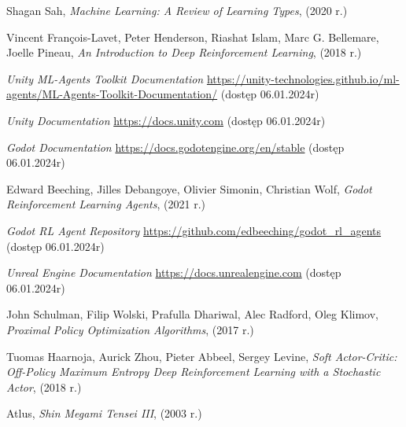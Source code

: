 \documentclass{SGGW-thesis}
\begin{document}
\begin{thebibliography}{9}
  Shagan Sah,
  \textit{Machine Learning: A Review of Learning Types},
  (2020 r.)

  Vincent François-Lavet, Peter Henderson, Riashat Islam, Marc G. Bellemare, Joelle Pineau,
  \textit{An Introduction to Deep Reinforcement Learning},
  (2018 r.)

  \textit{Unity ML-Agents Toolkit Documentation} 
  \url{https://unity-technologies.github.io/ml-agents/ML-Agents-Toolkit-Documentation/}
  (dostęp 06.01.2024r)

  \textit{Unity Documentation}
  \url{https://docs.unity.com}
  (dostęp 06.01.2024r)

  \textit{Godot Documentation}
  \url{https://docs.godotengine.org/en/stable}
  (dostęp 06.01.2024r)

  Edward Beeching, Jilles Debangoye, Olivier Simonin, Christian Wolf,
  \textit{Godot Reinforcement Learning Agents},
  (2021 r.)

  \textit{Godot RL Agent Repository}
  \url{https://github.com/edbeeching/godot_rl_agents}
  (dostęp 06.01.2024r)

  \textit{Unreal Engine Documentation}
  \url{https://docs.unrealengine.com}
  (dostęp 06.01.2024r)
  
  John Schulman, Filip Wolski, Prafulla Dhariwal, Alec Radford, Oleg Klimov, 
  \textit{Proximal Policy Optimization Algorithms},
  (2017 r.)

  Tuomas Haarnoja, Aurick Zhou, Pieter Abbeel, Sergey Levine, 
  \textit{Soft Actor-Critic: Off-Policy Maximum Entropy Deep Reinforcement Learning with a Stochastic Actor},
  (2018 r.)

  Atlus,
  \textit{Shin Megami Tensei III},
  (2003 r.)
\end{thebibliography}

\beforelastpage
\end{document}
